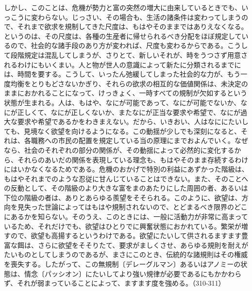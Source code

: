 しかし、このことは、危機が勢力と富の突然の増大に由来しているときでも、いっこうに変わらない。じっさい、その場合も、生活の諸条件は変わってしまうので、それまで欲求を規制してきた尺度は、もはやそのままではありえなくなる。というのは、その尺度は、各種の生産者に帰せられるべき分配をほぼ規定しているので、社会的な諸手段のあり方が変われば、尺度も変わるからである。こうして段階規定は混乱してしまうが、さりとて、新しいそれが、時をうつさず用意されるわけにもいくまい。人と物が世人の意識によって新たに分類されるまでには、時間を要する。こうして、いったん弛緩してしまった社会的な力が、もう一度均衡をとりもどさないかぎり、それらの欲求の相互的な価値関係は、未決定のままにおかれることになって、けっきょく、一時すべての規制が欠如するという状態が生まれる。人は、もはや、なにが可能であって、なにが可能でないか、なにが正しくて、なにが正しくないか、またなにが正当な要求や希望で、なにが過大な要求や希望であるかをわきまえない。だから、いきおい、人はなににたいしても、見境なく欲望を向けるようになる。この動揺が少しでも深刻になると、それは、各職務への市民の配置を規定している当の原理にまでおよんでいく。なぜなら、社会のそれぞれの部分の関係が、その動揺によって必然的に変化するから、それらのあいだの関係を表現している理念も、もはやそのまま存続するわけにはいかなくなるためである。危機のおかげで特別の利益にあずかった階級は、もはやそれまでのような忍従に甘んじていることはできない。また、そのことへの反動として、その階級のより大きな富をまのあたりにした周囲の者、あるいは下位の階級の者は、ありとあらゆる羨望をそそられる。このように、欲望は、方向を見失った世論によってはもはや規制されないので、とどまるべき限界のどこにあるかを知らない。そのうえ、このときには、一般に活動力が非常に高まっているため、それだけでも、欲望はひとりでに興奮状態におかれている。繁栄が増すので、欲望も高揚するというわけである。欲望にたいして供されるますます豊富な餌は、さらに欲望をそそりたて、要求がましくさせ、あらゆる規則を耐えがたいものとしてしまうのであるが、まさにこのとき、伝統的な諸規則はその権威を喪失する。したがって、この無規制〔デレーグルマン〕あるいはアノミーの状態は、情念〔パッシオン〕にたいしてより強い規律が必要であるにもかかわらず、それが弱まっていることによって、ますます度を強める。（310-311）

\subsection{}



